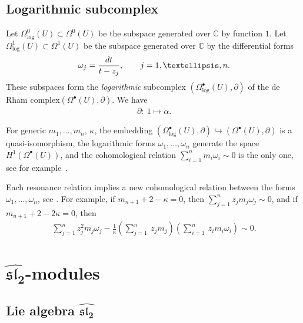 \documentclass[11pt]{article}
\numberwithin{equation}{section}
\begin{document}
\subsection{Logarithmic subcomplex} \label{log forms}
Let $\Omega_{\log}^0(U) \subset \Omega^0(U)$ be the subspace generated over ${\mathbb C}$ by function $1$. Let $\Omega_{\log}^1(U) \subset \Omega^1(U)$ be the subspace generated over ${\mathbb C}$ by the differential forms
\begin{gather*}
\omega_j=\frac{{\rm d}t}{t-z_j}, \qquad j=1,\dots,n.
\end{gather*}
These subspaces form the {\it logarithmic} subcomplex $(\Omega^\bullet_{\log}(U), \partial)$ of the de Rham complex\linebreak $(\Omega^\bullet(U), \partial)$. We have
\begin{gather*}
\partial\colon \ 1 \mapsto \alpha.
\end{gather*}

For generic $m_1,\dots, m_n$, $\kappa$, the embedding $(\Omega^\bullet_{\log}(U), \partial)\hookrightarrow (\Omega^\bullet(U), \partial)$ is a quasi-isomorphism, the logarithmic forms $\omega_1,\dots,\omega_n$ generate the space $H^1(\Omega^\bullet(U))$, and the cohomological relation $\sum\limits_{i=1}^n m_i \omega_i\sim 0$ is the only one, see for example~\cite{STV}.

Each resonance relation implies a new cohomological relation between the forms $\omega_1,\dots,\omega_n$, see \cite[Corollary 6.4]{SV2}. For example, if $m_{n+1}+2-\kappa=0$, then $\sum\limits_{j=1}^n z_j m_j\omega_j \sim 0$, and if $m_{n+1}+2-2\kappa=0$, then
\begin{gather*}
\sum_{j=1}^n z_j^2m_j\omega_j-\frac{1}{\kappa}\left(\sum_{j=1}^n\ z_jm_j\right)\left(\sum_{i=1}^n\ z_im_i\omega_i\right)\sim 0.
\end{gather*}

\section[$\widehat{{\mathfrak{sl}_2}}$-modules]{$\boldsymbol{\widehat{{\mathfrak{sl}_2}}}$-modules} \label{sec hsl}
\subsection[Lie algebra $\widehat{{\mathfrak{sl}_2}}$]{Lie algebra $\boldsymbol{\widehat{{\mathfrak{sl}_2}}}$} \label{lie alg hsl}
\end{document}
